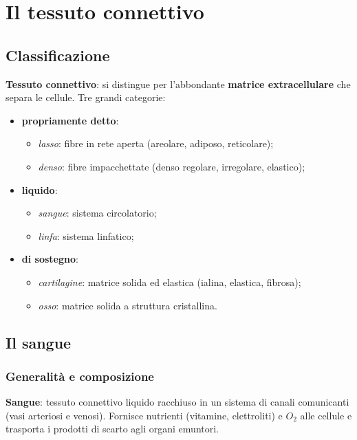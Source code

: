 \chapter{Il tessuto connettivo}

\section{Classificazione}

\textbf{Tessuto connettivo}: si distingue per l'abbondante \textbf{matrice extracellulare} che
separa le cellule. Tre grandi categorie:
\begin{itemize}
  \item \textbf{propriamente detto}:
    \begin{itemize}
      \item \textit{lasso}: fibre in rete aperta (areolare, adiposo, reticolare);
      \item \textit{denso}: fibre impacchettate (denso regolare, irregolare, elastico);
    \end{itemize}
  \item \textbf{liquido}:
    \begin{itemize}
      \item \textit{sangue}: sistema circolatorio;
      \item \textit{linfa}: sistema linfatico;
    \end{itemize}
  \item \textbf{di sostegno}:
    \begin{itemize}
      \item \textit{cartilagine}: matrice solida ed elastica (ialina, elastica, fibrosa);
      \item \textit{osso}: matrice solida a struttura cristallina.
    \end{itemize}
\end{itemize}

\section{Il sangue}

\subsection{Generalità e composizione}
\textbf{Sangue}: tessuto connettivo liquido racchiuso in un sistema di canali comunicanti (vasi
arteriosi e venosi). Fornisce nutrienti (vitamine, elettroliti) e $O_2$ alle cellule e trasporta i
prodotti di scarto agli organi emuntori.

